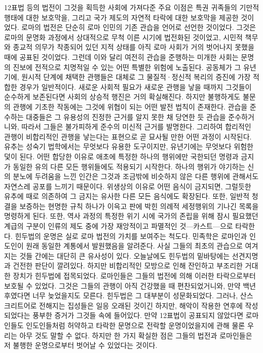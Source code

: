 12표법 등의 법전이 그것을 획득한 사회에 가져다준 주요 이점은
특권 귀족들의 기만적 행태에 대한 보호막을,
그리고 국가 제도의 자연적 타락에 대한 보호막을 제공한 것이었다.
로마의 법전은 단순히 로마 인민의 기존 관습을 언어로 선언한 것이었다.
그것은 로마의 문명화 과정에서 상대적으로 무척 이른 시기에 법전화된 것이었고,
시민적 책무와 종교적 의무가 착종되어 있던 지적 상태를 아직
로마 사회가 거의 벗어나지 못했을 때에 공표된 것이었다.
그런데 이와 달리 여전히 관습을 준행하는 미개한 사회는
문명의 진보에 전적으로 치명적일 수 있는 어떤 특별한 위험에 노출된다.
공동체가 그 유년기에, 원시적 단계에 채택한 관행들은
대체로 그 물질적^^b7정신적 복리의 증진에 가장 적합한 경우가 일반적이다.
새로운 사회적 필요가 새로운 관행을 낳을 때까지 그것들이 순수하게 보존된다면
사회의 상승적 행진은 거의 확실해진다.
하지만 불행하게도 불문의 관행에 기초한 작동에는 그것에 위협이 되는
어떤 발전 법칙이 존재한다.
관습을 준수하는 대중들은 그 유용성의 진정한 근거를 알지 못한 채
당연한 듯 관습을 준수하거니와,
따라서 그들은 불가피하게 준수의 미신적 근거를 발명한다.
그리하여 합리적인 관행이 비합리적인 관행을 낳는다는 표현으로
곧 묘사될 만한 어떤 과정이 시작된다.
유추는 성숙기 법학에서는 무엇보다 유용한 도구이지만,
유년기에는 무엇보다 위험한 덫이 된다.
어떤 합당한 이유로 애초에 특정한 하나의 행위에만 국한되던 명령과 금지가
동일한 유의 다른 모든 행위들에도 적용되기 시작한다.
하나의 행위가 야기하는 신의 분노에 두려움을 느낀 인간은
그것과 조금밖에 비슷하지 않은 다른 행위에 관해서도
자연스레 공포를 느끼기 때문이다.
위생상의 이유로 어떤 음식이 금지되면,
그럴듯한 유추에 때로 의존하여
그 금지는 유사한 다른 모든 음식에도 확장된다.
또한, 일반적 청결을 보증하는 현명한 규칙 하나가 이윽고
판에 박힌 의례적 세정행위의 기나긴 목록을 명령하게 된다.
또한, 역사 과정의 특정한 위기 시에 국가의 존립을 위해 잠시 필요했던
계급의 구분이 인류의 제도 중에 가장 재앙적이고 파멸적인 것---카스트---으로
타락한다.
힌두법의 운명은 실로 로마 법전의 가치를 보여주는 척도다.
민족학은 로마인과 인도인이 원래 동일한 계통에서 발원했음을 알려준다.
사실 그들의 최초의 관습으로 여겨지는 것들 간에는
대단히 큰 유사성이 있다.
오늘날에도 힌두법의 밑바탕에는 선견지명과 건전한 판단이 깔려있다.
하지만 비합리적인 모방으로 인해 잔인하고 부조리한 거대한 장치가
힌두법에 접목되었다.
로마인들은 그들의 법전에 의해 이러한 타락으로부터 보호될 수 있었다.
그것은 그들의 관행이 아직 건강했을 때 편찬되었거니와,
만약 백년 후였다면 너무 늦었을지도 모른다.
힌두법은 그 대부분이 성문화되었다.
그러나,
산스크리트어로 전해지는 집성들은 일응 오래된 것이긴 하지만,
해악이 작용한 연후에 작성되었다는 풍부한 증거가 그것들 속에 들어있다.
만약 12표법이 공표되지 않았다면 로마인들도 인도인들처럼
허약하고 타락한 문명으로 전락할 운명이었을지에 관해
물론 우리는 아무 것도 말할 수 없다.
하지만 한 가지 확실한 점은 그들의 법전과 
로마인들은 저 불행한 운명으로부터 벗어날 수 있었다는 것이다.


